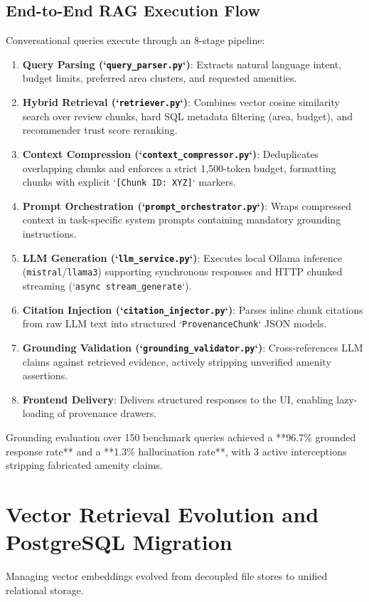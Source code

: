 \subsection{End-to-End RAG Execution Flow}
Conversational queries execute through an 8-stage pipeline:
\begin{enumerate}
    \item \textbf{Query Parsing (`\texttt{query\_parser.py}`)}: Extracts natural language intent, budget limits, preferred area clusters, and requested amenities.
    \item \textbf{Hybrid Retrieval (`\texttt{retriever.py}`)}: Combines vector cosine similarity search over review chunks, hard SQL metadata filtering (area, budget), and recommender trust score reranking.
    \item \textbf{Context Compression (`\texttt{context\_compressor.py}`)}: Deduplicates overlapping chunks and enforces a strict 1,500-token budget, formatting chunks with explicit `\texttt{[Chunk ID: XYZ]}` markers.
    \item \textbf{Prompt Orchestration (`\texttt{prompt\_orchestrator.py}`)}: Wraps compressed context in task-specific system prompts containing mandatory grounding instructions.
    \item \textbf{LLM Generation (`\texttt{llm\_service.py}`)}: Executes local Ollama inference (\texttt{mistral}/\texttt{llama3}) supporting synchronous responses and HTTP chunked streaming (`\texttt{async stream\_generate}`).
    \item \textbf{Citation Injection (`\texttt{citation\_injector.py}`)}: Parses inline chunk citations from raw LLM text into structured `\texttt{ProvenanceChunk}` JSON models.
    \item \textbf{Grounding Validation (`\texttt{grounding\_validator.py}`)}: Cross-references LLM claims against retrieved evidence, actively stripping unverified amenity assertions.
    \item \textbf{Frontend Delivery}: Delivers structured responses to the UI, enabling lazy-loading of provenance drawers.
\end{enumerate}

Grounding evaluation over 150 benchmark queries achieved a **96.7\% grounded response rate** and a **1.3\% hallucination rate**, with 3 active interceptions stripping fabricated amenity claims.

\section{Vector Retrieval Evolution and PostgreSQL Migration}
Managing vector embeddings evolved from decoupled file stores to unified relational storage.

